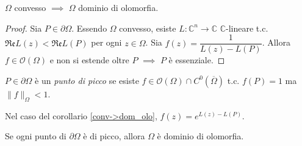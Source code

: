 \begin{cor} \label{conv->dom_olo}
  $\Omega$ convesso $\implies$ $\Omega$ dominio di olomorfia.
\end{cor}

\begin{proof}
  Sia $P \in \partial \Omega$. Essendo $\Omega$ convesso, esiste $L: \mathbb{C}^n \longrightarrow \mathbb{C}$ $\mathbb{C}$-lineare t.c. $\mathfrak{Re}L(z) < \mathfrak{Re}L(P)$ per ogni $z \in \Omega$. Sia $f(z)=\dfrac{1}{L(z)-L(P)}$. Allora $f \in \mathcal{O}(\Omega)$ e non si estende oltre $P$ $\implies$ $P$ è essenziale.
\end{proof}

\begin{defn}
  $P \in \partial\Omega$ è un \textit{punto di picco} se esiste $f \in \mathcal{O}(\Omega) \cap C^0(\overline{\Omega})$ t.c. $f(P)=1$ ma $\|f\|_\Omega<1$.
\end{defn}

\begin{ex}
  Nel caso del corollario \ref{conv->dom_olo}, $f(z)=e^{L(z)-L(P)}$.
\end{ex}

\begin{exc}
  Se ogni punto di $\partial\Omega$ è di picco, allora $\Omega$ è dominio di olomorfia.
\end{exc}
